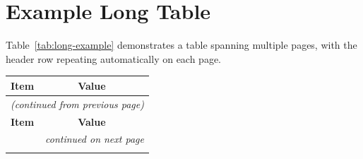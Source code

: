 \section{Example Long Table}

Table~\ref{tab:long-example} demonstrates a table spanning multiple pages,
with the header row repeating automatically on each page.

\begin{longtable}{ll}
	\longtablecaption{Example long table spanning multiple pages.}{tab:long-example}
	\toprule
	\textbf{Item} & \textbf{Value} \\
	\midrule
	\endfirsthead
	
	\multicolumn{2}{l}{\small\itshape (continued from previous page)} \\
	\toprule
	\textbf{Item} & \textbf{Value} \\
	\midrule
	\endhead
	
	\midrule
	\multicolumn{2}{r}{\small\itshape continued on next page} \\
	\endfoot
	
	\bottomrule
	\endlastfoot
	

\end{longtable}
